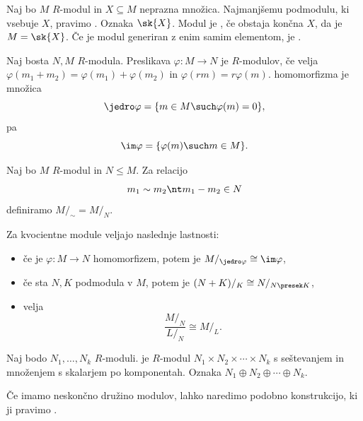 \begin{definicija}
  Naj bo $M$ $R$-modul in $X \subseteq M$ neprazna množica.
  Najmanjšemu podmodulu, ki vsebuje $X$, pravimo .
  Oznaka $\sk{X}$.
  Modul je , če obstaja končna $X$, da je $M = \sk{X}$.
  Če je modul generiran z enim samim elementom, je .
\end{definicija}

\begin{definicija}
  Naj bosta $N, M$ $R$-modula.
  Preslikava $\varphi : M \to N$ je  $R$-modulov, če velja
  $\varphi(m_1 + m_2) = \varphi(m_1) + \varphi(m_2)$ in $\varphi(r m) = r
  \varphi(m)$.
   homomorfizma je množica
  \[
	\jedro \varphi = \{m \in M \such \varphi(m) = 0\},
  \]
   pa
  \[
	\im \varphi = \{\varphi(m) \such m \in M\}.
  \]
\end{definicija}

\begin{definicija}
  Naj bo $M$ $R$-modul in $N \le M$.
  Za relacijo
  \[
	m_1 \sim m_2 \nt m_1 - m_2 \in N
  \]
  definiramo  $M/_\sim = M/_N$.
\end{definicija}

\begin{izrek}
  Za kvocientne module veljajo naslednje lastnosti:
  \begin{itemize}
  \item če je $\varphi : M \to N$ homomorfizem, potem je $M/_{\jedro \varphi}
	\cong \im \varphi$,
  \item če sta $N, K$ podmodula v $M$, potem je $(N+K)/_K \cong N/_{N \presek
	  K}$,
  \item velja
	\[
	  \frac{M/_N}{L/_N} \cong M/_L.
	\]
  \end{itemize}
\end{izrek}

\begin{definicija}
  Naj bodo $N_1, \ldots, N_k$ $R$-moduli.
   je $R$-modul $N_1 \times N_2 \times \cdots
  \times N_k$ s seštevanjem in množenjem s skalarjem po komponentah.
  Oznaka $N_1 \oplus N_2 \oplus \cdots \oplus N_k$.
\end{definicija}

\begin{opomba}
  Če imamo neskončno družino modulov, lahko naredimo podobno konstrukcijo, ki ji
  pravimo .
\end{opomba}

